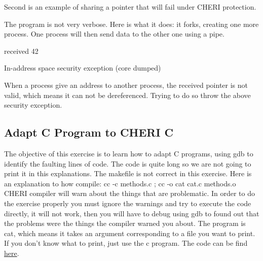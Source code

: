 \documentclass[a4paper, 11pt]{article}
\begin{document}
		
		Second is an example of sharing a pointer that will fail under CHERI protection.
		
	
	
		The program is not very verbose. Here is what it does: it forks, creating one more process. One process will then send data to the other one using a pipe.
		\begin{tcolorbox}[colback=gray!5!white, colframe=blue!75!black, title=Execution of long transmission on CHERI environment]
			received 42
		\end{tcolorbox}
		\begin{tcolorbox}[colback=gray!5!white, colframe=blue!75!black, title=Execution of ptr transmission on CHERI environment]
			In-address space security exception (core dumped)
		\end{tcolorbox}
		When a process give an address to another process, the received pointer is not valid, which means it can not be dereferenced. Trying to do so throw the above security exception.
	
	\subsection{Adapt C Program to CHERI C}
		The objective of this exercise is to learn how to adapt C programs, using gdb to identify the faulting lines of code.
		The code is quite long so we are not going to print it in this explanations.
		The makefile is not correct in this exercise. Here is an explanation to how compile:
		cc -c methods.c ; 
		cc -o cat cat.c methods.o
		CHERI compiler will warn about the things that are problematic. In order to do the exercise properly you must ignore the warnings and try to execute the code directly, it will not work, then you will have to debug using gdb to found out that the problems were the things the compiler warned you about.
		The program is cat, which means it takes an argument corresponding to a file you want to print.
		If you don't know what to print, just use the c program.
		The code can be find \href{https://ctsrd-cheri.github.io/cheri-exercises/exercises/adapt-c/index.html}{here}.
	
\end{document}
